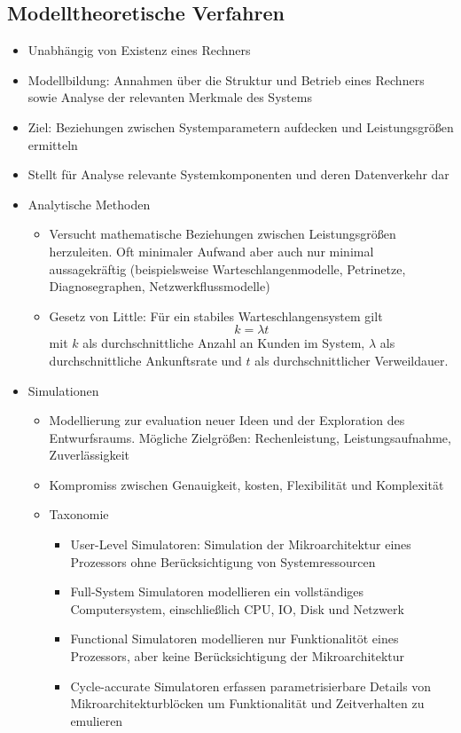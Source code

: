 \subsection{Modelltheoretische Verfahren}
\begin{itemize}
	\item Unabhängig von Existenz eines Rechners
		\item Modellbildung: Annahmen über die Struktur und Betrieb eines Rechners sowie Analyse der relevanten Merkmale des Systems 
		\item Ziel: Beziehungen zwischen Systemparametern aufdecken und Leistungsgrößen ermitteln
		\item Stellt für Analyse relevante Systemkomponenten und deren Datenverkehr dar
		\item Analytische Methoden
		\begin{itemize}
			\item Versucht mathematische Beziehungen zwischen Leistungsgrößen herzuleiten. Oft minimaler Aufwand aber auch nur minimal aussagekräftig (beispielsweise Warteschlangenmodelle, Petrinetze, Diagnosegraphen, Netzwerkflussmodelle)
			\item Gesetz von Little: Für ein stabiles Warteschlangensystem gilt \[k=\lambda t\] mit $k$ als durchschnittliche Anzahl an Kunden im System, $\lambda$ als durchschnittliche Ankunftsrate und $t$ als durchschnittlicher Verweildauer.
		\end{itemize}
	\item Simulationen
	\begin{itemize}
		\item Modellierung zur evaluation neuer Ideen und der Exploration des Entwurfsraums. Mögliche Zielgrößen: Rechenleistung, Leistungsaufnahme, Zuverlässigkeit
		\item Kompromiss zwischen Genauigkeit, kosten, Flexibilität und Komplexität
		\item Taxonomie
		\begin{itemize}
			\item User-Level Simulatoren: Simulation der Mikroarchitektur eines Prozessors ohne Berücksichtigung von Systemressourcen
			\item Full-System Simulatoren modellieren ein vollständiges Computersystem, einschließlich CPU, IO, Disk und Netzwerk	
			\item Functional Simulatoren modellieren nur Funktionalitöt eines Prozessors, aber keine Berücksichtigung der Mikroarchitektur
			\item Cycle-accurate Simulatoren erfassen parametrisierbare Details von Mikroarchitekturblöcken um Funktionalität und Zeitverhalten zu emulieren

\end{itemize}
\end{itemize}
\end{itemize}
